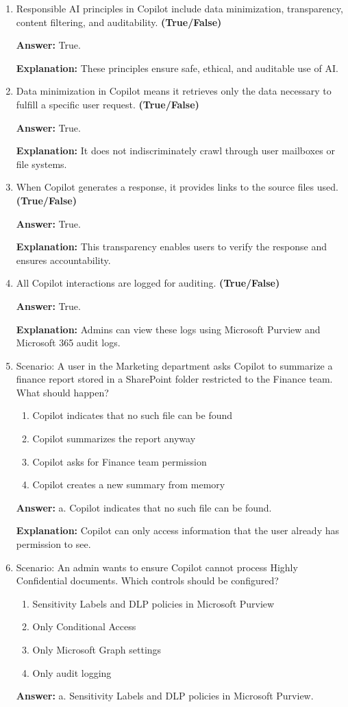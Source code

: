 \documentclass[10pt]{article}
\begin{document}
\begin{enumerate}[leftmargin=*]
\item Responsible AI principles in Copilot include data minimization, transparency, content filtering, and auditability. \textbf{(True/False)}

\textbf{Answer:} True.

\textbf{Explanation:} These principles ensure safe, ethical, and auditable use of AI.

\item Data minimization in Copilot means it retrieves only the data necessary to fulfill a specific user request. \textbf{(True/False)}

\textbf{Answer:} True.

\textbf{Explanation:} It does not indiscriminately crawl through user mailboxes or file systems.

\item When Copilot generates a response, it provides links to the source files used. \textbf{(True/False)}

\textbf{Answer:} True.

\textbf{Explanation:} This transparency enables users to verify the response and ensures accountability.

\item All Copilot interactions are logged for auditing. \textbf{(True/False)}

\textbf{Answer:} True.

\textbf{Explanation:} Admins can view these logs using Microsoft Purview and Microsoft 365 audit logs.

\item Scenario: A user in the Marketing department asks Copilot to summarize a finance report stored in a SharePoint folder restricted to the Finance team. What should happen?
\begin{enumerate}[label=\alph*., leftmargin=1.5em]
\item Copilot indicates that no such file can be found
\item Copilot summarizes the report anyway
\item Copilot asks for Finance team permission
\item Copilot creates a new summary from memory
\end{enumerate}
\textbf{Answer:} a. Copilot indicates that no such file can be found.

\textbf{Explanation:} Copilot can only access information that the user already has permission to see.

\item Scenario: An admin wants to ensure Copilot cannot process Highly Confidential documents. Which controls should be configured?
\begin{enumerate}[label=\alph*., leftmargin=1.5em]
\item Sensitivity Labels and DLP policies in Microsoft Purview
\item Only Conditional Access
\item Only Microsoft Graph settings
\item Only audit logging
\end{enumerate}
\textbf{Answer:} a. Sensitivity Labels and DLP policies in Microsoft Purview.


\end{enumerate}
\end{document}
